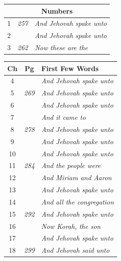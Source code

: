 \documentclass{article}
\newlength{\minipageheight}
\newlength{\minipagewidth}
\begin{document}
\begin{minipage}[r][\minipageheight][t]{\minipagewidth}
\begin{longtable}{ccl}
        \multicolumn{3}{c}{\textbf{Numbers}}                           \\
        \hline
        1           & \textit{257} & \textit{And Jehovah spake unto}   \\
        2           &              & \textit{And Jehovah spake unto}   \\
        3           & \textit{262} & \textit{Now these are the}        \\
    \end{longtable}
\end{minipage}%
%
%
\begin{minipage}[r][\minipageheight][t]{\minipagewidth}%
    \begin{longtable}{ccl}
        \textbf{Ch} & \textbf{Pg}  & \textbf{First Few Words}           \\%
        \hline%
        \endfirsthead%
        4           &              & \textit{And Jehovah spake unto}    \\
        5           & \textit{269} & \textit{And Jehovah spake unto}    \\
        6           &              & \textit{And Jehovah spake unto}    \\
        7           &              & \textit{And it came to}            \\
        8           & \textit{278} & \textit{And Jehovah spake unto}    \\
        9           &              & \textit{And Jehovah spake unto}    \\
        10          &              & \textit{And Jehovah spake unto}    \\
        11          & \textit{284} & \textit{And the people were}       \\
        12          &              & \textit{And Miriam and Aaron}      \\
        13          &              & \textit{And Jehovah spake unto}    \\
        14          &              & \textit{And all the congregation}  \\
        15          & \textit{292} & \textit{And Jehovah spake unto}    \\
        16          &              & \textit{Now Korah, the son}        \\
        17          &              & \textit{And Jehovah spake unto}    \\
        18          & \textit{299} & \textit{And Jehovah said unto}     \\

\end{longtable}
\end{minipage}
\end{document}
